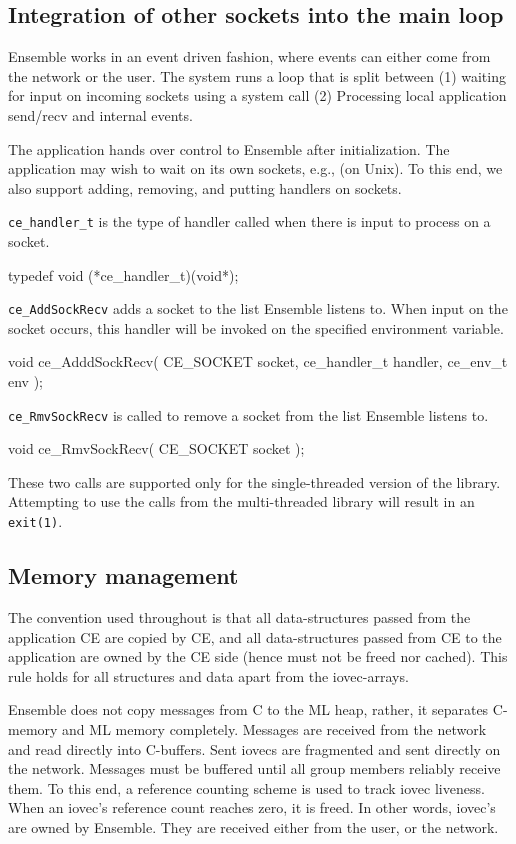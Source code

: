 \subsection{Integration of other sockets into the main loop}
Ensemble works in an event driven fashion, where events can either
come from the network or the user. The system runs a loop that is
split between (1) waiting for input on incoming sockets using a
 system call (2) Processing local
application send/recv and internal events. 

The application hands over control to Ensemble after initialization.
The application may wish to wait on its own sockets, e.g.,  (on
Unix). To this end, we also support adding, removing, and putting
handlers on sockets.

{\tt ce\_handler\_t} is the type of handler called when there is input
to process on a socket.
\begin{codebox}
typedef void (*ce_handler_t)(void*);
\end{codebox}

{\tt ce\_AddSockRecv} adds a socket to the list Ensemble listens to. 
When input on the socket occurs, this handler will be invoked
on the specified environment variable.
\begin{codebox}
void ce_AdddSockRecv(
    CE_SOCKET socket,
    ce_handler_t handler,
    ce_env_t env
);
\end{codebox}

{\tt ce\_RmvSockRecv} is called to remove a socket from the list 
Ensemble listens to.
\begin{codebox}
void ce_RmvSockRecv(
    CE_SOCKET socket
);
\end{codebox}

These two calls are supported only for the single-threaded version of
the library. Attempting to use the calls from the multi-threaded
library will result in an {\tt exit(1)}. 

\subsection{Memory management}
The convention used throughout is that all data-structures passed from
the application CE are copied by CE, and all data-structures passed
from CE to the application are owned by the CE side (hence must not be
freed nor cached). This rule holds for all structures and data apart
from the iovec-arrays.

Ensemble does not copy messages from C to the ML heap, rather, it
separates C-memory and ML memory completely. Messages are received
from the network and read directly into C-buffers. Sent iovecs are
fragmented and sent directly on the network. Messages must be buffered
until all group members reliably receive them. To this end, a
reference counting scheme is used to track iovec liveness. When an
iovec's reference count reaches zero, it is freed. In other words,
iovec's are owned by Ensemble. They are received either from the 
user, or the network.

